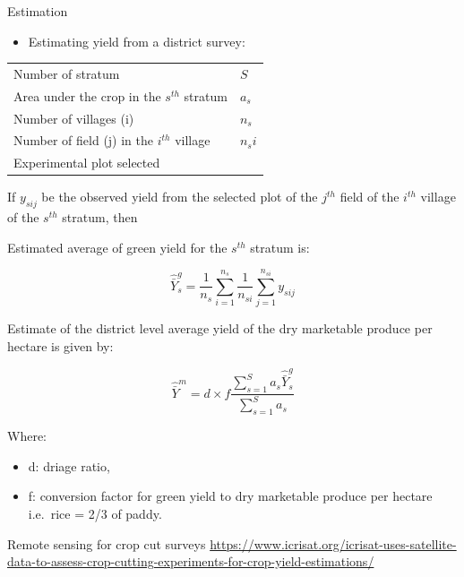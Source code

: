 \documentclass[11pt,dvipsnames,ignorenonframetext,aspectratio=169]{beamer}
\providecommand{\tightlist}{%
  \setlength{\itemsep}{0pt}\setlength{\parskip}{0pt}}
\begin{document}
\begin{frame}{Estimation}
\protect\hypertarget{estimation-1}{}
\begin{itemize}
\tightlist
\item
  Estimating yield from a district survey:
\end{itemize}

\begin{table}
\centering\begingroup\fontsize{8}{10}\selectfont

\begin{tabular}{ll}
\toprule
 & \\
\midrule
Number of stratum & $S$\\
Area under the crop in the $s^{th}$ stratum & $a_s$\\
Number of villages (i) & $n_s$\\
Number of field (j) in the $i^{th}$ village & $n_si$\\
Experimental plot selected & \\
\bottomrule
\end{tabular}
\endgroup{}
\end{table}
\end{frame}

\begin{frame}{}
\protect\hypertarget{section-2}{}
If \(y_{sij}\) be the observed yield from the selected plot of the
\(j^{th}\) field of the \(i^{th}\) village of the \(s^{th}\) stratum,
then

Estimated average of green yield for the \(s^{th}\) stratum is:

\[
\hat{\bar{Y}}_s^g = \frac{1}{n_s} \sum^{n_{s}}_{i = 1} \frac{1}{n_{si}} \sum^{n_{si}}_{j = 1} y_{sij}
\]

Estimate of the district level average yield of the dry marketable
produce per hectare is given by:

\[
\hat{\bar{Y}}^m = d \times f \frac{\sum^S_{s = 1} a_s \hat{\bar{Y}}_s^g}{\sum^S_{s = 1}a_s}
\]

Where:

\begin{itemize}
\tightlist
\item
  d: driage ratio,
\item
  f: conversion factor for green yield to dry marketable produce per
  hectare i.e.~rice = 2/3 of paddy.
\end{itemize}
\end{frame}

\begin{frame}{Remote sensing for crop cut surveys}
\protect\hypertarget{remote-sensing-for-crop-cut-surveys}{}
\url{https://www.icrisat.org/icrisat-uses-satellite-data-to-assess-crop-cutting-experiments-for-crop-yield-estimations/}
\end{frame}
\end{document}
